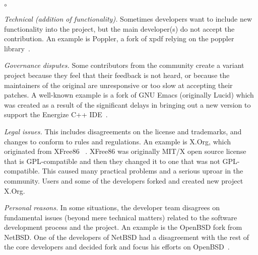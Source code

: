 \begin{list}{$\circ$}{}
   \item \textit{Technical (addition of functionality).} Sometimes developers want to include new functionality into the project, but the main developer(s) do not accept the contribution. An example is \textsf{Poppler}, a fork of \textsf{xpdf} relying on the \textsf{poppler} library~\cite{Gregorio:2012}.

    \item \textit{Governance disputes.} Some contributors from the community create a variant project because they feel that their feedback is not heard, or because the maintainers of the original are unresponsive or too slow at accepting their patches. A well-known example is a fork of \textsf{GNU Emacs} (originally \textsf{Lucid}) which was created as a result of the significant delays in bringing out a new version to support the Energize C++ IDE~\cite{Wheeler:2015Forking}.

\item \textit{Legal issues.} This includes disagreements on the license and trademarks, and changes to conform to rules and regulations. An example is \textsf{X.Org}, which originated from \textsf{XFree86} ~\cite{Gregorio:2012,Wheeler:2015Forking}. \textsf{XFree86} was originally \textsf{MIT/X} open source license that is GPL-compatible and then they changed it to one that was not GPL-compatible. This caused many practical problems and a serious uproar in the community. Users and some of the developers forked and created new project \textsf{X.Org}.

\item \textit{Personal reasons.} In some situations, the developer team disagrees on fundamental issues (beyond mere technical matters) related to the software development process and the project. An example is the \textsf{OpenBSD} fork from \textsf{NetBSD}. One of the developers of \textsf{NetBSD} had a disagreement with the rest of the core developers and decided fork and focus his efforts on \textsf{OpenBSD}~\cite{theo:openbsd}.


\end{list}

